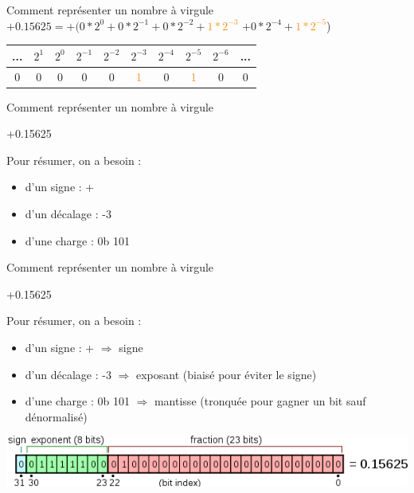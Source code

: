 \documentclass{beamer}
\begin{document}
  \begin{frame}{Comment représenter un nombre à virgule} 
    $+0.15625 = +(0*2^{0} + 0*2^{-1} + 0*2^{-2} + $\textcolor{DarkOrange}{$1*2^{-3}$} $+ 0*2^{-4} + $\textcolor{DarkOrange}{$1*2^{-5}$})
    \begin{center}
      \begin{tabular}{|c|c|c|c|c||c|c|c|c|c|} \hline
        ... & $2^{1}$ & $2^{0}$ & $2^{-1}$ & $2^{-2}$ & $2^{-3}$ & $2^{-4}$ & $2^{-5}$ & $2^{-6}$ & ... \\ \hline
        0 & 0 & 0 & 0 & 0 & \textcolor{DarkOrange}{1} & 0 & \textcolor{DarkOrange}{1} & 0 & 0 \\ \hline
      \end{tabular}
    \end{center}
  \end{frame}
  
  \begin{frame}{Comment représenter un nombre à virgule} 
    \begin{Huge}
    \begin{center}
    +0.15625
    \end{center}
    \end{Huge}
Pour résumer, on a besoin : 
    \begin{itemize}
      \item d'un signe : + 
      \item d'un décalage : -3 
      \item d'une charge : 0b 101
    \end{itemize}
  \end{frame}
 
  \begin{frame}{Comment représenter un nombre à virgule} 
    \begin{Huge}
    \begin{center}
    +0.15625
    \end{center}
    \end{Huge}
Pour résumer, on a besoin : 
    \begin{itemize}
      \item d'un signe : + $\Rightarrow$ signe
      \item d'un décalage : -3 $\Rightarrow$ exposant (biaisé pour éviter le signe)
      \item d'une charge : 0b 101 $\Rightarrow$ mantisse (tronquée pour gagner un bit sauf dénormalisé)
    \end{itemize}
    
    \includegraphics[width=\textwidth]{float_representation}
  \end{frame}
  
\end{document}
